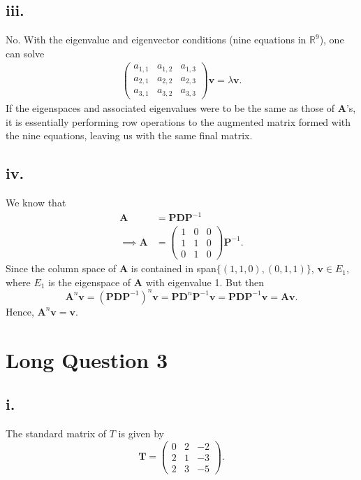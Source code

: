 \documentclass{article}
\begin{document}
\subsection*{iii.}
No. With the eigenvalue and eigenvector conditions (nine equations in $\mathbb{R}^9$), one can solve
\begin{align*}
    \begin{pmatrix}
        a_{1,1} & a_{1,2} & a_{1,3} \\
        a_{2,1} & a_{2,2} & a_{2,3} \\
        a_{3,1} & a_{3,2} & a_{3,3}
    \end{pmatrix} \mathbf{v} = \lambda \mathbf{v}.
\end{align*}If the eigenspaces and associated eigenvalues were to be the same as those of $\mathbf{A}$'s, it is essentially performing row operations to the augmented matrix formed with the nine equations, leaving us with the same final matrix.
\subsection*{iv.} 
We know that 
\begin{align*}
    \mathbf{A} &= \mathbf{P} \mathbf{D} \mathbf{P}^{-1} \\
    \implies \mathbf{A} &= \begin{pmatrix}
        1 & 0 & 0 \\
        1 & 1 & 0 \\
        0 & 1 & 0
    \end{pmatrix} \mathbf{P}^{-1}.
\end{align*}
Since the column space of $\mathbf{A}$ is contained in span$\{(1,1,0),(0,1,1)\}$, $\mathbf{v} \in E_1$, where $E_1$ is the eigenspace of $\mathbf{A}$ with eigenvalue 1. But then 
\[\mathbf{A}^n\mathbf{v} = (\mathbf{P} \mathbf{D} \mathbf{P}^{-1})^n\mathbf{v} = \mathbf{P} \mathbf{D}^n \mathbf{P}^{-1}\mathbf{v} = \mathbf{P} \mathbf{D} \mathbf{P}^{-1} \mathbf{v} = \mathbf{A} \mathbf{v}.\]
Hence, $\mathbf{A}^n\mathbf{v} = \mathbf{v}.$
\section*{Long Question 3}
\subsection*{i.}
The standard matrix of $T$ is given by
\[\mathbf{T} = \begin{pmatrix}
    0 & 2 & -2 \\
    2 & 1 & -3 \\
    2 & 3 & -5
\end{pmatrix}.\]
\end{document}
